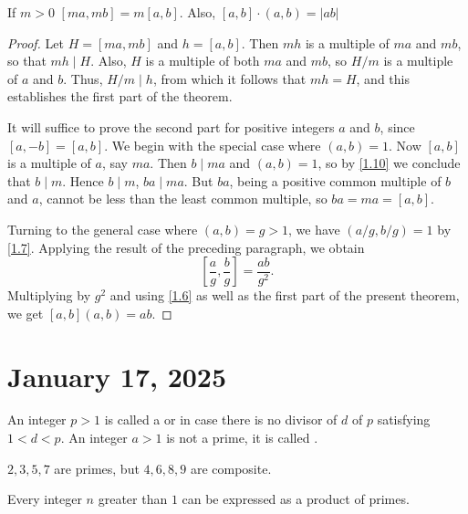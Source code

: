\documentclass[11pt]{article}
\begin{document}
\begin{theorem}\label{1.13}
	If \(m > 0\) \([ma, mb] = m[a, b]\). Also, \([a,b] \cdot (a, b) = |ab|\)
\end{theorem}
\begin{proof}
	Let \( H = [ma, mb] \) and \( h = [a, b] \). Then \( mh \) is a multiple of \( ma \) and \( mb \), so that \( mh \mid H \). Also, \( H \) is a multiple of both \( ma \) and \( mb \), so \( H / m \) is a multiple of \( a \) and \( b \). Thus, \( H / m \mid h \), from which it follows that \( mh = H \), and this establishes the first part of the theorem.

	It will suffice to prove the second part for positive integers \( a \) and \( b
	\), since \( [a, -b] = [a, b] \). We begin with the special case where \( (a,
	b) = 1 \). Now \( [a, b] \) is a multiple of \( a \), say \( ma \). Then \( b
	\mid ma \) and \( (a, b) = 1 \), so by \cref{1.10} we conclude that \( b \mid m
	\). Hence \( b \mid m \), \( ba \mid ma \). But \( ba \), being a positive
	common multiple of \( b \) and \( a \), cannot be less than the least common
	multiple, so \( ba = ma = [a, b] \).

	Turning to the general case where \( (a, b) = g > 1 \), we have \( (a/g, b/g) =
	1 \) by \cref{1.7}. Applying the result of the preceding paragraph, we obtain
	\[
		\left[ \frac{a}{g}, \frac{b}{g} \right] = \frac{ab}{g^2}.
	\]
	Multiplying by \( g^2 \) and using \cref{1.6} as well as the first part of the
	present theorem, we get \( [a, b](a, b) = ab \).
\end{proof}

\section{January 17, 2025}
\begin{definition}
	An integer \(p > 1\) is called a  or  in case there is no divisor of \(d\) of \(p\) satisfying \(1 < d < p\). An integer \(a > 1\) is not a prime, it is called .
\end{definition}
\begin{example}
	\(2, 3, 5, 7\) are primes, but \(4, 6, 8, 9\) are composite.
\end{example}
\begin{theorem}\label{1.14}
	Every integer \(n\) greater than \(1\) can be expressed as a product of primes.
\end{theorem}
\end{document}
